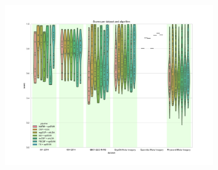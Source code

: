 \begin{figure}
    \centering
    \begin{subfigure}[t]{\textwidth}
        \centering
        \includegraphics[width=\textwidth]{Figures/scores.pdf}
    \end{subfigure}%
     

\end{figure}
